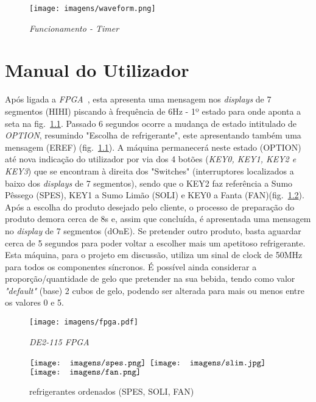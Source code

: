\documentclass{report}
\begin{document}
\begin{figure} 
    \centering
    \texttt{[image: imagens/waveform.png]}
    \caption{\textit{Funcionamento - Timer}} \label{fig6:timer}
\end{figure}

\chapter{Manual do Utilizador}
\label{chap.manual}
Após ligada a \textit{FPGA}~\cite{unknown2021}, esta apresenta uma mensagem nos \textit{displays} de 7 segmentos (HIHI) piscando à frequência de 6Hz - 1º estado para onde aponta a seta na fig.~\ref{fig6:fpga}. Passado 6 segundos ocorre a mudança de estado intitulado de \textit{OPTION}, resumindo "Escolha de refrigerante", este  apresentando também uma mensagem (EREF) (fig.~\ref{fig6:fpga}). A máquina permanecerá neste estado (OPTION) até nova indicação do utilizador por via dos 4 botões (\textit{KEY0, KEY1, KEY2 e KEY3}) que se encontram à direita dos "Switches" (interruptores localizados a baixo dos \textit{displays} de 7 segmentos), sendo que o KEY2 faz referência a Sumo Pêssego (SPES), KEY1 a Sumo Limão (SOLI) e KEY0 a Fanta (FAN)(fig.~\ref{refrig}). Após a escolha do produto desejado pelo cliente, o processo de preparação do produto demora cerca de 8s e, assim que concluída, é apresentada uma mensagem no \textit{display} de 7 segmentos (dOnE). Se pretender outro produto, basta aguardar cerca de 5 segundos para poder voltar a escolher mais um apetitoso refrigerante. Esta máquina, para o projeto em discussão, utiliza um sinal de clock de 50MHz para todos os componentes síncronos. É possível ainda considerar a proporção/quantidade de gelo que pretender na sua bebida, tendo como valor \textit{"default"} (base) 2 cubos de gelo, podendo ser alterada para mais ou menos entre os valores 0 e 5.


\begin{figure} 
    \centering
    \texttt{[image: imagens/fpga.pdf]}
    \caption{\textit{DE2-115 FPGA}} \label{fig6:fpga}
\end{figure}

  \begin{figure}[!h]
\centering
  $\vcenter{\hbox{\texttt{[image: imagens/spes.png]}}}$
  \qquad
  $\vcenter{\hbox{\texttt{[image: imagens/slim.jpg]}}}$
  \qquad
  $\vcenter{\hbox{\texttt{[image: imagens/fan.png]}}}$
\caption{refrigerantes ordenados (SPES, SOLI, FAN)}
\label{refrig}
\end{figure}
\end{document}
